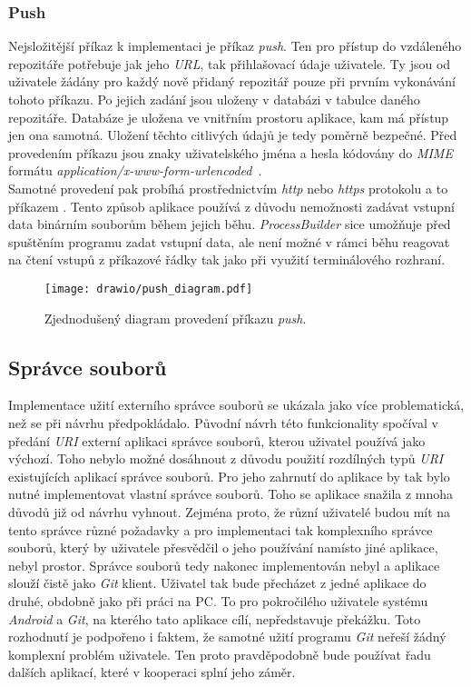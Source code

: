         \subsubsection{Push}
        Nejsložitější příkaz k implementaci je příkaz \emph{push}. Ten pro přístup do vzdáleného repozitáře potřebuje jak jeho \emph{URL}, tak přihlašovací údaje uživatele. Ty jsou od uživatele žádány pro každý nově přidaný repozitář pouze při prvním vykonávání tohoto příkazu. Po jejich zadání jsou uloženy v databázi v tabulce daného repozitáře. Databáze je uložena ve vnitřním prostoru aplikace, kam má přístup jen ona samotná. Uložení těchto citlivých údajů je tedy poměrně bezpečné. Před provedením příkazu jsou znaky uživatelského jména a hesla kódovány do \emph{MIME} formátu \emph{application/x-www-form-urlencoded}~.\\ Samotné provedení pak probíhá prostřednictvím \emph{http} nebo \emph{https} protokolu a to příkazem .
        Tento způsob aplikace používá z důvodu nemožnosti zadávat vstupní data binárním souborům během jejich běhu. \emph{ProcessBuilder} sice umožňuje před spuštěním programu zadat vstupní data, ale není možné v rámci běhu reagovat na čtení vstupů z příkazové řádky tak jako při využití terminálového rozhraní.

        \newpage
        \begin{figure}[h]
            \centering
            \vspace{0.5cm}
            \texttt{[image: drawio/push\_diagram.pdf]}
            \caption[Diagram provedení příkazu push]{Zjednodušený diagram provedení příkazu \emph{push}.}
            \label{diagram:push}
        \end{figure}
    
    \subsection{Správce souborů}
    Implementace užití externího správce souborů se ukázala jako více problematická, než se při návrhu předpokládalo. Původní návrh této funkcionality spočíval v předání \emph{URI} externí aplikaci správce souborů, kterou uživatel používá jako výchozí. Toho nebylo možné dosáhnout z důvodu použití rozdílných typů \emph{URI} existujících aplikací správce souborů. Pro jeho zahrnutí do aplikace by tak bylo nutné implementovat vlastní správce souborů. Toho se aplikace snažila z mnoha důvodů již od návrhu vyhnout. Zejména proto, že různí uživatelé budou mít na tento správce různé požadavky a pro implementaci tak komplexního správce souborů, který by uživatele přesvědčil o jeho používání namísto jiné aplikace, nebyl prostor. Správce souborů tedy nakonec implementován nebyl a aplikace slouží čistě jako \emph{Git} klient. Uživatel tak bude přecházet z jedné aplikace do druhé, obdobně jako při práci na PC. To pro pokročilého uživatele systému \emph{Android} a \emph{Git}, na kterého tato aplikace cílí, nepředstavuje překážku.
    Toto rozhodnutí je podpořeno i faktem, že samotné užití programu \emph{Git} neřeší žádný komplexní problém uživatele. Ten proto pravděpodobně bude používat řadu dalších aplikací, které v kooperaci splní jeho záměr.

